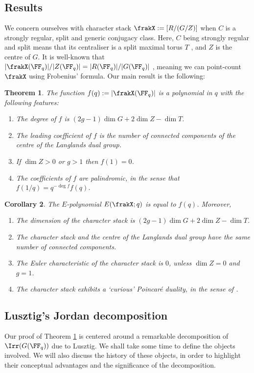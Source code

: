 \documentclass{amsart}
\theoremstyle{plain}
\newtheorem{thm}{Theorem}
\newtheorem{cor}[thm]{Corollary}
\theoremstyle{definition}
\theoremstyle{remark}
\begin{document}
\subsection*{Results}
We concern ourselves with character stack $\frakX := [R/(G/Z)]$ when $C$ is a strongly regular, split and generic conjugacy class. Here, $C$ being strongly regular and split means that its centraliser is a split maximal torus $T$ \cite{Stein65}, and $Z$ is the centre of $G$. It is well-known that $|\frakX(\FF_q)|/|Z(\FF_q)| = |R(\FF_q)|/|G(\FF_q)|$ \cite[Lemma 2.5.1]{Behrend93}, meaning we can point-count $\frakX$ using Frobenius' formula. Our main result is the following:
\begin{thm}\label{ThmDegree}
The function $f(q):=|\frakX(\FF_q)|$ is a polynomial in $q$ with the following features:
\begin{enumerate}[\itshape(i)]
\item The degree of $f$ is $(2g-1)\dim G + 2\dim Z - \dim T$.
\item The leading coefficient of $f$ is the number of connected components of the centre of the Langlands dual group. 
\item If $\dim Z>0$ or $g>1$ then $f(1)=0$.
\item The coefficients of $f$ are palindromic, in the sense that $f(1/q) = q^{-\deg f}f(q)$.
\end{enumerate}
\end{thm}
\begin{cor}
The $E$-polynomial $E(\frakX;q)$ is equal to $f(q)$. Moreover,
\begin{enumerate}[\itshape(i)]
\item The dimension of the character stack is $(2g-1)\dim G + 2\dim Z - \dim T$.
\item The character stack and the centre of the Langlands dual group have the same number of connected components. 
\item The Euler characteristic of the character stack is $0$, unless $\dim Z=0$ and $g=1$.
\item The character stack exhibits a `curious' Poincar\'e duality, in the sense of \cite{HRV08,HLRV11}.
\end{enumerate}
\end{cor}









\subsection*{Lusztig's Jordan decomposition} 
Our proof of Theorem \ref{ThmDegree} is centered around a remarkable decomposition of $\Irr(G(\FF_q))$ due to Lusztig. We shall take some time to define the objects involved. We will also discuss the history of these objects, in order to highlight their conceptual advantages and the significance of the decomposition.
\end{document}
